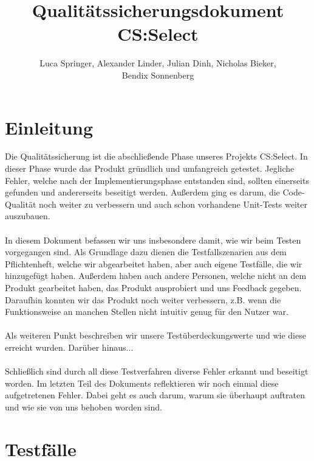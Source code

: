 \documentclass[a4paper]{scrreprt}
\begin{document}
    \title{Qualitätssicherungsdokument CS:Select}
    \author{Luca Springer, Alexander Linder, Julian Dinh, Nicholas Bieker,\\ Bendix Sonnenberg}
    \maketitle

    \tableofcontents
    \chapter{Einleitung}
    Die Qualitätssicherung ist die abschließende Phase unseres Projekts CS:Select. In dieser Phase wurde das Produkt
    gründlich und umfangreich getestet. Jegliche Fehler, welche nach der Implementierungsphase entstanden sind, sollten einerseits
    gefunden und andererseits beseitigt werden. Außerdem ging es darum,
    die Code-Qualität noch weiter zu verbessern und auch schon vorhandene Unit-Tests weiter auszubauen. \\
    \\
    In diesem Dokument befassen wir uns insbesondere damit, wie wir beim Testen vorgegangen sind. Als Grundlage dazu
    dienen die Testfallszenarien aus dem Pflichtenheft, welche wir abgearbeitet haben, aber auch eigene Testfälle, die wir hinzugefügt haben. Außerdem
    haben auch andere Personen, welche nicht an dem Produkt gearbeitet haben, das Produkt ausprobiert und uns Feedback gegeben. Daraufhin
    konnten wir das Produkt noch weiter verbessern, z.B. wenn die Funktionsweise an manchen Stellen nicht intuitiv genug für den Nutzer war. \\
    \\
    Als weiteren Punkt beschreiben wir unsere Testüberdeckungswerte und wie diese erreicht wurden. Darüber hinaus... \\ %
    \\
    Schließlich sind durch all diese Testverfahren diverse Fehler erkannt und beseitigt worden. Im letzten Teil des Dokuments
    reflektieren wir noch einmal diese aufgetretenen Fehler. Dabei geht es auch darum, warum sie überhaupt auftraten
    und wie sie von uns behoben worden sind.





    \chapter{Testfälle}
\end{document}
